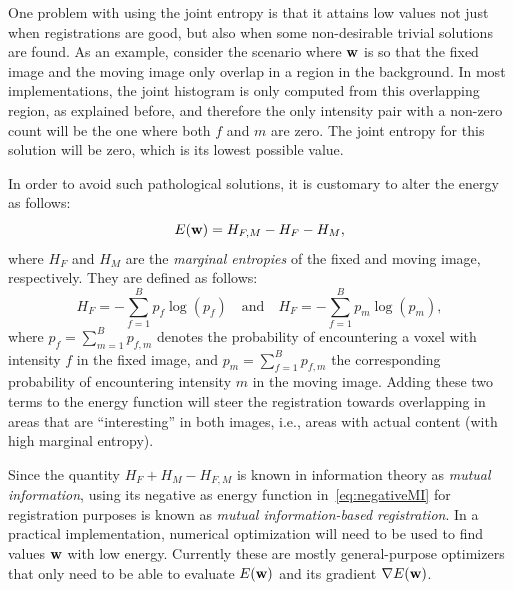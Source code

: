 \documentclass[10pt,twoside]{book}
\begin{document}
%
One problem with using the joint entropy is that it attains low values not just when registrations are good, but also when some non-desirable trivial solutions are found. As an example, consider the scenario where $\mathbf{w}$ is so that the fixed image and the moving image only overlap in a region in the background. In most implementations, the joint histogram is only computed from this overlapping region, as explained before, and therefore the only intensity pair with a non-zero count will be the one where both $f$ and $m$ are zero. The joint entropy for this solution will be zero, which is its lowest possible value.

In order to avoid such pathological solutions, it is customary to alter the energy as follows:
\begin{equation}
E(\mathbf{w}) = H_{F,M} - H_{F} - H_{M}
,
\label{eq:negativeMI}
\end{equation}
where $H_{F}$ and $H_{M}$ are the \emph{marginal entropies} of the fixed and moving image, respectively. 
They are defined as follows:
$$
H_{F} = -\sum_{f=1}^{B} p_f \log( p_f )
\quad
\text{and}
\quad
H_{F} = -\sum_{f=1}^{B} p_m \log( p_m ),
$$
where $p_f = \sum_{m=1}^B p_{f,m}$
denotes the probability of encountering a voxel 
with intensity $f$
in the fixed image, 
and $p_m = \sum_{f=1}^B p_{f,m}$
the corresponding probability of encountering intensity $m$ in the moving image.
%
Adding these two terms to the energy function will steer the registration towards overlapping in areas that are ``interesting'' in both images, i.e., areas with actual content (with high marginal entropy).

Since the quantity
$
H_{F} + H_{M} - H_{F,M}  
$
is known in information theory as \emph{mutual information}, using its negative as energy function in~\eqref{eq:negativeMI} for registration purposes is known as \emph{mutual information-based registration}.
%
In a practical implementation, numerical optimization will need to be used to find values $\mathbf{w}$ with low energy. Currently these are mostly general-purpose optimizers that only need to be able to evaluate $E(\mathbf{w})$ and its gradient $\nabla E(\mathbf{w})$.
\end{document}
